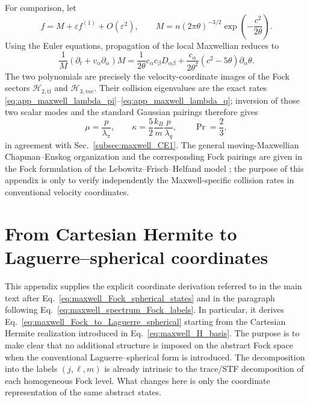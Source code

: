 \documentclass[11pt,oneside]{article}
\numberwithin{equation}{section}
\theoremstyle{definition}
\begin{document}
For comparison, let
\begin{equation}
f=M+\varepsilon f^{(1)}+O(\varepsilon^2),
\qquad
M=n(2\pi\theta)^{-3/2}
\exp\!\left(-\frac{c^2}{2\theta}\right).
\end{equation}
Using the Euler equations, propagation of the local Maxwellian reduces to
\begin{equation}
\frac1M
(\partial_t+v_\alpha\partial_\alpha)M
=
\frac1{2\theta}c_\alpha c_\beta D_{\alpha\beta}
+
\frac{c_\alpha}{2\theta^2}(c^2-5\theta)\partial_\alpha\theta.
\label{eq:app_maxwell_CE_source}
\end{equation}
The two polynomials are precisely the velocity-coordinate images of the Fock sectors $\mathscr H_{2,\mathrm{tl}}$ and $\mathscr H_{3,\mathrm{vec}}$.  Their collision eigenvalues are the exact rates \eqref{eq:app_maxwell_lambda_pi}--\eqref{eq:app_maxwell_lambda_q}; inversion of those two scalar modes and the standard Gaussian pairings therefore gives
\begin{equation}
\mu=\frac{p}{\lambda_\pi},
\qquad
\kappa=\frac52\frac{k_B}{m}\frac{p}{\lambda_q},
\qquad
\Pr=\frac23,
\end{equation}
in agreement with Sec.~\ref{subsec:maxwell_CE1}.  The general moving-Maxwellian Chapman--Enskog organization and the corresponding Fock pairings are given in the Fock formulation of the Lebowitz--Frisch--Helfand model \cite{Karlin2026LFHFock}; the purpose of this appendix is only to verify independently the Maxwell-specific collision rates in conventional velocity coordinates.



\section{From Cartesian Hermite to Laguerre--spherical coordinates}
\label{app:maxwell_Hermite_Laguerre}

This appendix supplies the explicit coordinate derivation referred to in the
main text after Eq.~\eqref{eq:maxwell_Fock_spherical_states} and in the
paragraph following Eq.~\eqref{eq:maxwell_spectrum_Fock_labels}.  In
particular, it derives Eq.~\eqref{eq:maxwell_Fock_to_Laguerre_spherical}
starting from the Cartesian Hermite realization introduced in
Eq.~\eqref{eq:maxwell_H_basis}.  The purpose is to make clear that no
additional structure is imposed on the abstract Fock space when the
conventional Laguerre--spherical form is introduced.  The
decomposition into the labels $(j,\ell,m)$ is already intrinsic to the
trace/STF decomposition of each homogeneous Fock level.  What changes here
is only the coordinate representation of the same abstract states.
\end{document}
